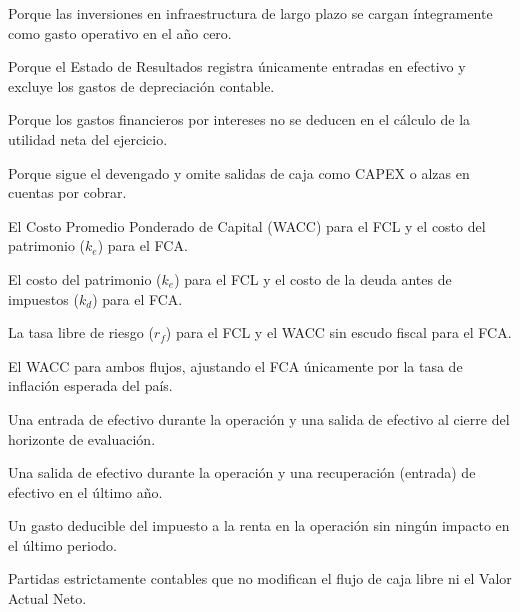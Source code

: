 \begin{opts}
    \item Porque las inversiones en infraestructura de largo plazo se cargan íntegramente como gasto operativo en el año cero.
    \item Porque el Estado de Resultados registra únicamente entradas en efectivo y excluye los gastos de depreciación contable.
    \item Porque los gastos financieros por intereses no se deducen en el cálculo de la utilidad neta del ejercicio.
    \item Porque sigue el devengado y omite salidas de caja como CAPEX o alzas en cuentas por cobrar.
\end{opts}

\begin{opts}
    \item El Costo Promedio Ponderado de Capital (WACC) para el FCL y el costo del patrimonio ($k_e$) para el FCA.
    \item El costo del patrimonio ($k_e$) para el FCL y el costo de la deuda antes de impuestos ($k_d$) para el FCA.
    \item La tasa libre de riesgo ($r_f$) para el FCL y el WACC sin escudo fiscal para el FCA.
    \item El WACC para ambos flujos, ajustando el FCA únicamente por la tasa de inflación esperada del país.
\end{opts}

\begin{opts}
    \item Una entrada de efectivo durante la operación y una salida de efectivo al cierre del horizonte de evaluación.
    \item Una salida de efectivo durante la operación y una recuperación (entrada) de efectivo en el último año.
    \item Un gasto deducible del impuesto a la renta en la operación sin ningún impacto en el último periodo.
    \item Partidas estrictamente contables que no modifican el flujo de caja libre ni el Valor Actual Neto.
\end{opts}

